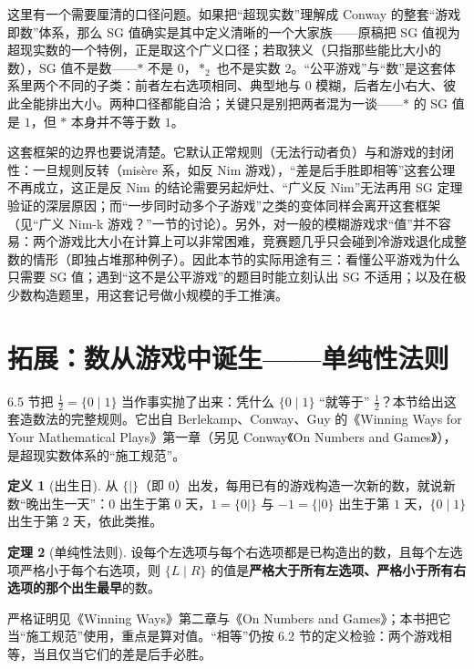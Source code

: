 \documentclass[UTF8,a4paper,11pt,oneside,openany,fontset=fandol]{ctexbook}
\theoremstyle{definition}
\newtheorem{definition}{定义}[chapter]
\newtheorem{theorem}[definition]{定理}
\begin{document}
\begin{pitfall}[口径与边界]
这里有一个需要厘清的口径问题。如果把“超现实数”理解成 Conway 的整套“游戏即数”体系，那么 SG 值确实是其中定义清晰的一个大家族——原稿把 SG 值视为超现实数的一个特例，正是取这个广义口径；若取狭义（只指那些能比大小的数），SG 值不是数——$\ast$ 不是 $0$，$\ast_2$ 也不是实数 $2$。“公平游戏”与“数”是这套体系里两个不同的子类：前者左右选项相同、典型地与 $0$ 模糊，后者左小右大、彼此全能排出大小。两种口径都能自洽；关键只是别把两者混为一谈——$\ast$ 的 SG 值是 $1$，但 $\ast$ 本身并不等于数 $1$。

这套框架的边界也要说清楚。它默认正常规则（无法行动者负）与和游戏的封闭性：一旦规则反转（misère 系，如反 Nim 游戏），“差是后手胜即相等”这套公理不再成立，这正是反 Nim 的结论需要另起炉灶、“广义反 Nim”无法再用 SG 定理验证的深层原因；而“一步同时动多个子游戏”之类的变体同样会离开这套框架（见“广义 Nim-k 游戏？”一节的讨论）。另外，对一般的模糊游戏求“值”并不容易：两个游戏比大小在计算上可以非常困难，竞赛题几乎只会碰到冷游戏退化成整数的情形（即独占堆那种例子）。因此本节的实际用途有三：看懂公平游戏为什么只需要 SG 值；遇到“这不是公平游戏”的题目时能立刻认出 SG 不适用；以及在极少数构造题里，用这套记号做小规模的手工推演。
\end{pitfall}

\section{拓展：数从游戏中诞生——单纯性法则}
6.5 节把 $\tfrac12=\{0\mid 1\}$ 当作事实抛了出来：凭什么 $\{0\mid 1\}$ “就等于” $\tfrac12$？本节给出这套造数法的完整规则。它出自 Berlekamp、Conway、Guy 的《Winning Ways for Your Mathematical Plays》第一章（另见 Conway《On Numbers and Games》），是超现实数体系的“施工规范”。

\begin{definition}[出生日]
从 $\{\mid\}$（即 $0$）出发，每用已有的游戏构造一次新的数，就说新数“晚出生一天”：$0$ 出生于第 $0$ 天，$1=\{0\mid\}$ 与 $-1=\{\mid 0\}$ 出生于第 $1$ 天，$\{0\mid 1\}$ 出生于第 $2$ 天，依此类推。
\end{definition}

\begin{theorem}[单纯性法则]\label{thm:simplicity}
设每个左选项与每个右选项都是已构造出的数，且每个左选项严格小于每个右选项，则 $\{L\mid R\}$ 的值是\textbf{严格大于所有左选项、严格小于所有右选项的那个出生最早}的数。
\end{theorem}

严格证明见《Winning Ways》第二章与《On Numbers and Games》；本书把它当“施工规范”使用，重点是算对值。“相等”仍按 6.2 节的定义检验：两个游戏相等，当且仅当它们的差是后手必胜。
\end{document}
